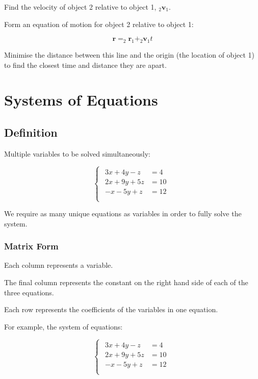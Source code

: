 \documentclass[a4paper,11pt]{report}
\newcommand{\bb}{\boldsymbol}
\begin{document}
Find the velocity of object 2 relative to object 1, $_2\bb{v}_1$.

Form an equation of motion for object 2 relative to object 1:

$$
\bb{r} = _2\bb{r}_1 + _2\bb{v}_1 t
$$

Minimise the distance between this line and the origin (the location of object
1) to find the closest time and distance they are apart.




\chapter{Systems of Equations}

\section{Definition}

Multiple variables to be solved simultaneously:

$$
\begin{cases}
\begin{aligned}
3x + 4y - z & = 4 \\
2x + 9y + 5z & = 10 \\
-x - 5y + z & = 12 \\
\end{aligned}
\end{cases}
$$

We require as many unique equations as variables in order to fully solve the
system.

\subsection{Matrix Form}

Each column represents a variable.

The final column represents the constant on the right hand side of each of the
three equations.

Each row represents the coefficients of the variables in one equation.

For example, the system of equations:

$$
\begin{cases}
\begin{aligned}
 3x + 4y - z & = 4  \\
2x + 9y + 5z & = 10 \\
 -x - 5y + z & = 12 \\
\end{aligned}
\end{cases}
$$
\end{document}

